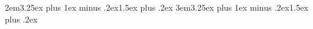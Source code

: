 \documentclass{book}
\begin{document}

\usepackage{changepage,lipsum,titlesec}
\titleformat{\subsection}[block]{}{\thesubsection}{1em}{}
\titleformat{\subsubsection}[block]{}{\thesubsubsection}{1em}{}
\titlespacing*{\subsection} {2em}{3.25ex plus 1ex minus .2ex}{1.5ex plus .2ex}
\titlespacing*{\subsubsection} {3em}{3.25ex plus 1ex minus .2ex}{1.5ex plus .2ex}

\usepackage{times}

\end{document}
